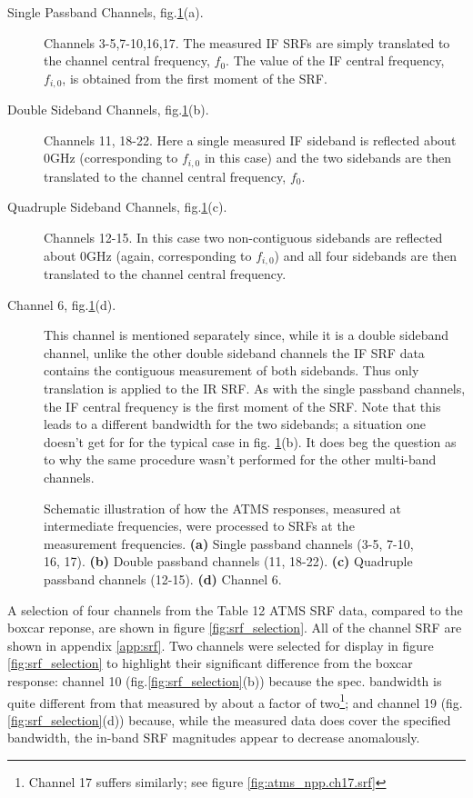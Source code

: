 \begin{description}
  \item[Single Passband Channels, fig.\ref{fig:r_and_s}(a).] Channels 3-5,7-10,16,17. The measured IF SRFs are simply translated to the channel central frequency, $f_0$. The value of the IF central frequency, $f_{i,0}$, is obtained from the first moment of the SRF.
  \item[Double Sideband Channels, fig.\ref{fig:r_and_s}(b).] Channels 11, 18-22. Here a single measured IF sideband is reflected about 0GHz (corresponding to $f_{i,0}$ in this case) and the two sidebands are then translated to the channel central frequency, $f_0$.
  \item[Quadruple Sideband Channels, fig.\ref{fig:r_and_s}(c).] Channels 12-15. In this case two non-contiguous sidebands are reflected about 0GHz (again, corresponding to $f_{i,0}$) and all four sidebands are then translated to the channel central frequency. 
  \item[Channel 6, fig.\ref{fig:r_and_s}(d).] This channel is mentioned separately since, while it is a double sideband channel, unlike the other double sideband channels the IF SRF data contains the contiguous measurement of both sidebands. Thus only translation is applied to the IR SRF. As with the single passband channels, the IF central frequency is the first moment of the SRF. Note that this leads to a different bandwidth for the two sidebands; a situation one doesn't get for for the typical case in fig. \ref{fig:r_and_s}(b). It does beg the question as to why the same procedure wasn't performed for the other multi-band channels.
\end{description}

\begin{figure}[t]
  \centering
  
  \caption{Schematic illustration of how the ATMS responses, measured at intermediate frequencies, were processed to SRFs at the measurement frequencies. \textbf{(a)} Single passband channels (3-5, 7-10, 16, 17). \textbf{(b)} Double passband channels (11, 18-22). \textbf{(c)} Quadruple passband channels (12-15). \textbf{(d)} Channel 6.}
  \label{fig:r_and_s}
\end{figure}

A selection of four channels from the Table 12 ATMS SRF data, compared to the boxcar reponse, are shown in figure \ref{fig:srf_selection}. All of the channel SRF are shown in appendix \ref{app:srf}. Two channels were selected for display in figure \ref{fig:srf_selection} to highlight their significant difference from the boxcar response: channel 10 (fig.\ref{fig:srf_selection}(b)) because the spec. bandwidth is quite different from that measured by about a factor of two\footnote{Channel 17 suffers similarly; see figure \ref{fig:atms_npp.ch17.srf}}; and channel 19 (fig.\ref{fig:srf_selection}(d)) because, while the measured data does cover the specified bandwidth, the in-band SRF magnitudes appear to decrease anomalously.

